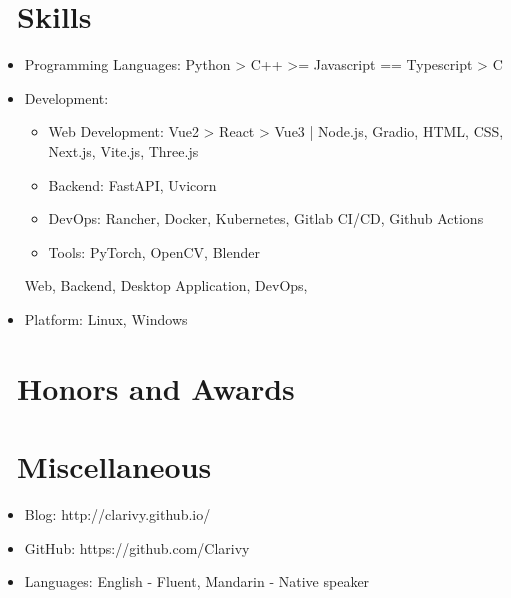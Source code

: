 \documentclass{resume}
\begin{document}
\section{\faCogs\ Skills}
\begin{itemize}[parsep=0.5ex]
  \item Programming Languages: Python > C++ >= Javascript == Typescript > C
  \item Development:
    \begin{itemize}
      \item Web Development: Vue2 > React > Vue3 | Node.js, Gradio, HTML, CSS, Next.js, Vite.js, Three.js
      \item Backend: FastAPI, Uvicorn
      \item DevOps: Rancher, Docker, Kubernetes, Gitlab CI/CD, Github Actions
      \item Tools: PyTorch, OpenCV, Blender
    \end{itemize}
  Web, Backend, Desktop Application, DevOps,
  \item Platform: Linux, Windows
\end{itemize}

\section{\faHeartO\ Honors and Awards}

\section{\faInfo\ Miscellaneous}
\begin{itemize}[parsep=0.5ex]
  \item Blog: http://clarivy.github.io/
  \item GitHub: https://github.com/Clarivy
  \item Languages: English - Fluent, Mandarin - Native speaker
\end{itemize}

%
%
\end{document}
